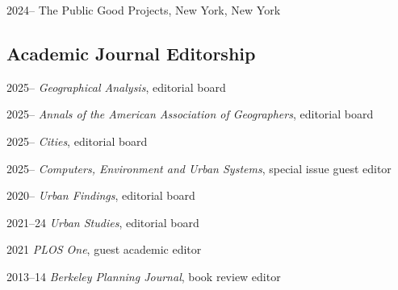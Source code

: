 \documentclass[11pt,letterpaper]{report} %
\begin{document}
    \begin{tablist}

       \item[2024--]    \tab{}The Public Good Projects, New York, New York

    \end{tablist}

    \subsection*{Academic Journal Editorship}

    \begin{tablist}

        \item[2025--]   \tab{}\textit{Geographical Analysis}, editorial board
        \item[2025--]   \tab{}\textit{Annals of the American Association of Geographers}, editorial board
        \item[2025--]   \tab{}\textit{Cities}, editorial board
        \item[2025--]   \tab{}\textit{Computers, Environment and Urban Systems}, special issue guest editor
        \item[2020--]   \tab{}\textit{Urban Findings}, editorial board
        \item[2021--24] \tab{}\textit{Urban Studies}, editorial board
        \item[2021]     \tab{}\textit{PLOS One}, guest academic editor
        \item[2013--14] \tab{}\textit{Berkeley Planning Journal}, book review editor

    \end{tablist}
\end{document}
